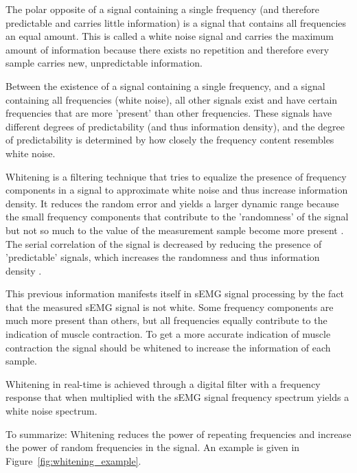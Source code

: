 The polar opposite of a signal containing a single frequency (and therefore predictable and carries little information) is a signal that contains all frequencies an equal amount. This is called a white noise signal and carries the maximum amount of information because there exists no repetition and therefore every sample carries new, unpredictable information.

Between the existence of a signal containing a single frequency, and a signal containing all frequencies (white noise), all other signals exist and have certain frequencies that are more 'present' than other frequencies. These signals have different degrees of predictability (and thus information density), and the degree of predictability is determined by how closely the frequency content resembles white noise.

Whitening is a filtering technique that tries to equalize the presence of frequency components in a signal to approximate white noise and thus increase information density. It reduces the random error and yields a larger dynamic range because the small frequency components that contribute to the 'randomness' of the signal but not so much to the value of the measurement sample become more present \cite[Ch. 5.4.9]{time_series_analysis_methods}\cite{single_site_emg_amplitude_estimation}. The serial correlation of the signal is decreased by reducing the presence of 'predictable' signals, which increases the randomness and thus information density \cite{serial_correlation_definition}. 

This previous information manifests itself in sEMG signal processing by the fact that the measured sEMG signal is not white. Some frequency components are much more present than others, but all frequencies equally contribute to the indication of muscle contraction. To get a more accurate indication of muscle contraction the signal should be whitened to increase the information of each sample.

Whitening in real-time is achieved through a digital filter with a frequency response that when multiplied with the sEMG signal frequency spectrum yields a white noise spectrum.

To summarize: Whitening reduces the power of repeating frequencies and increase the power of random frequencies in the signal. An example is given in Figure~\ref{fig:whitening_example}.

